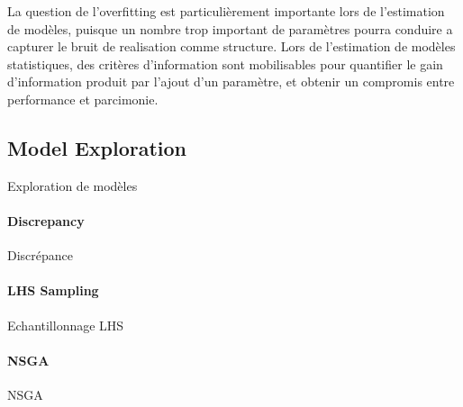 
La question de l'overfitting est particulièrement importante lors de l'estimation de modèles, puisque un nombre trop important de paramètres pourra conduire a capturer le bruit de realisation comme structure. Lors de l'estimation de modèles statistiques, des critères d'information sont mobilisables pour quantifier le gain d'information produit par l'ajout d'un paramètre, et obtenir un compromis entre performance et parcimonie.





\subsection*{Model Exploration}{Exploration de modèles}


\paragraph{Discrepancy}{Discrépance}




\paragraph{LHS Sampling}{Echantillonnage LHS}




\paragraph{NSGA}{NSGA}







